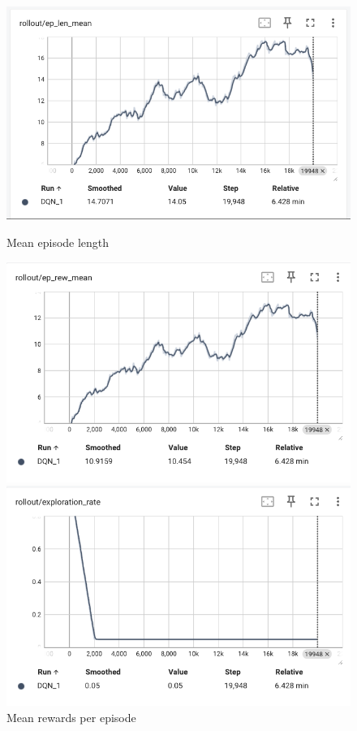\documentclass{article}
\begin{document}
\begin{figure}[ht]
  \centering
  \begin{minipage}{0.48\textwidth}
      \includegraphics[width=\linewidth]{./figures/dqn_baseline_ep_len_mean.png}
      \caption{Mean episode length}
      \label{fig:ep_len_mean}
  \end{minipage}
  \begin{minipage}{0.48\textwidth}
      \includegraphics[width=\linewidth]{./figures/dqn_baseline_ep_reward_mean.png}
      \caption{Mean rewards per episode}
      \label{fig:reward_mean}
  \end{minipage}
  \begin{minipage}{0.48\textwidth}
    \includegraphics[width=\linewidth]{./figures/ddn_baseline_exploration_rate.png}

\end{minipage}
\end{figure}
\end{document}
